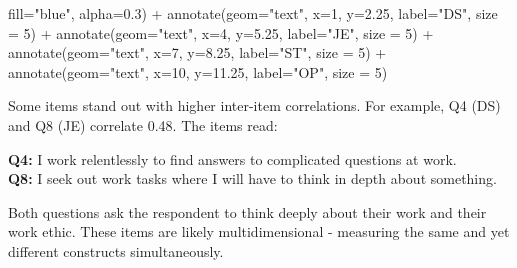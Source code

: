 \documentclass[
  letterpaper,
  DIV=11,
  numbers=noendperiod]{scrartcl}
\newenvironment{Shaded}{\begin{snugshade}}{\end{snugshade}}
\newcommand{\AttributeTok}[1]{\textcolor[rgb]{0.40,0.45,0.13}{#1}}
\newcommand{\DecValTok}[1]{\textcolor[rgb]{0.68,0.00,0.00}{#1}}
\newcommand{\FloatTok}[1]{\textcolor[rgb]{0.68,0.00,0.00}{#1}}
\newcommand{\FunctionTok}[1]{\textcolor[rgb]{0.28,0.35,0.67}{#1}}
\newcommand{\NormalTok}[1]{\textcolor[rgb]{0.00,0.23,0.31}{#1}}
\newcommand{\SpecialCharTok}[1]{\textcolor[rgb]{0.37,0.37,0.37}{#1}}
\newcommand{\StringTok}[1]{\textcolor[rgb]{0.13,0.47,0.30}{#1}}
\begin{document}
\begin{Shaded}
\begin{Highlighting}[]
           \AttributeTok{fill=}\StringTok{"blue"}\NormalTok{, }
           \AttributeTok{alpha=}\FloatTok{0.3}\NormalTok{) }\SpecialCharTok{+}
  \FunctionTok{annotate}\NormalTok{(}\AttributeTok{geom=}\StringTok{"text"}\NormalTok{,}
           \AttributeTok{x=}\DecValTok{1}\NormalTok{,}
           \AttributeTok{y=}\FloatTok{2.25}\NormalTok{,}
           \AttributeTok{label=}\StringTok{"DS"}\NormalTok{,}
           \AttributeTok{size =} \DecValTok{5}\NormalTok{) }\SpecialCharTok{+}
  \FunctionTok{annotate}\NormalTok{(}\AttributeTok{geom=}\StringTok{"text"}\NormalTok{,}
           \AttributeTok{x=}\DecValTok{4}\NormalTok{,}
           \AttributeTok{y=}\FloatTok{5.25}\NormalTok{,}
           \AttributeTok{label=}\StringTok{"JE"}\NormalTok{,}
           \AttributeTok{size =} \DecValTok{5}\NormalTok{) }\SpecialCharTok{+}
  \FunctionTok{annotate}\NormalTok{(}\AttributeTok{geom=}\StringTok{"text"}\NormalTok{,}
           \AttributeTok{x=}\DecValTok{7}\NormalTok{,}
           \AttributeTok{y=}\FloatTok{8.25}\NormalTok{,}
           \AttributeTok{label=}\StringTok{"ST"}\NormalTok{,}
           \AttributeTok{size =} \DecValTok{5}\NormalTok{) }\SpecialCharTok{+}
  \FunctionTok{annotate}\NormalTok{(}\AttributeTok{geom=}\StringTok{"text"}\NormalTok{,}
           \AttributeTok{x=}\DecValTok{10}\NormalTok{,}
           \AttributeTok{y=}\FloatTok{11.25}\NormalTok{,}
           \AttributeTok{label=}\StringTok{"OP"}\NormalTok{,}
           \AttributeTok{size =} \DecValTok{5}\NormalTok{)}
\end{Highlighting}
\end{Shaded}

Some items stand out with higher inter-item correlations. For example,
Q4 (DS) and Q8 (JE) correlate 0.48. The items read:

\textbf{Q4:} I work relentlessly to find answers to complicated
questions at work.\\
\textbf{Q8:} I seek out work tasks where I will have to think in depth
about something.

Both questions ask the respondent to think deeply about their work and
their work ethic. These items are likely multidimensional - measuring
the same and yet different constructs simultaneously.
\end{document}
